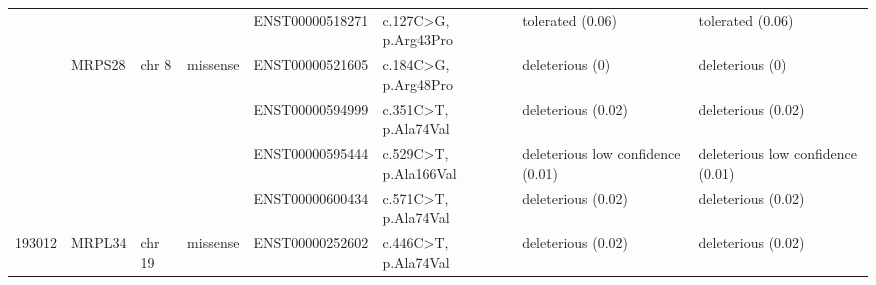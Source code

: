 \documentclass[fleqn,10pt]{wlscirep}
\begin{document}
\begin{landscape}
\begin{table}[]
{\begin{tabular}{|l|l|l|l|l|l|l|l|}
{\color[HTML]{000000} }                         & {\color[HTML]{000000} }                         & {\color[HTML]{000000} }                         & {\color[HTML]{000000} }                           & {\color[HTML]{000000} ENST00000518271}     & {\color[HTML]{000000} c.127C\textgreater{}G, p.Arg43Pro}   & {\color[HTML]{000000} tolerated (0.06)}                  & tolerated (0.06)                  \\ \cline{5-8} 
{\color[HTML]{000000} }                         & \multirow{-3}{*}{{\color[HTML]{000000} MRPS28}} & \multirow{-3}{*}{{\color[HTML]{000000} chr 8}}  & \multirow{-3}{*}{{\color[HTML]{000000} missense}} & {\color[HTML]{000000} ENST00000521605}     & {\color[HTML]{000000} c.184C\textgreater{}G, p.Arg48Pro}   & {\color[HTML]{000000} deleterious (0)}                   & deleterious (0)                   \\ \cline{2-8} 
{\color[HTML]{000000} }                         & {\color[HTML]{000000} }                         & {\color[HTML]{000000} }                         & {\color[HTML]{000000} }                           & {\color[HTML]{000000} ENST00000594999}     & {\color[HTML]{000000} c.351C\textgreater{}T, p.Ala74Val}   & {\color[HTML]{000000} deleterious (0.02)}                & deleterious (0.02)                \\ \cline{5-8} 
{\color[HTML]{000000} }                         & {\color[HTML]{000000} }                         & {\color[HTML]{000000} }                         & {\color[HTML]{000000} }                           & {\color[HTML]{000000} ENST00000595444}     & {\color[HTML]{000000} c.529C\textgreater{}T, p.Ala166Val}  & {\color[HTML]{000000} deleterious low confidence (0.01)} & deleterious low confidence (0.01) \\ \cline{5-8} 
{\color[HTML]{000000} }                         & {\color[HTML]{000000} }                         & {\color[HTML]{000000} }                         & {\color[HTML]{000000} }                           & {\color[HTML]{000000} ENST00000600434}     & {\color[HTML]{000000} c.571C\textgreater{}T, p.Ala74Val}   & {\color[HTML]{000000} deleterious (0.02)}                & deleterious (0.02)                \\ \cline{5-8} 
\multirow{-7}{*}{{\color[HTML]{000000} 193012}} & \multirow{-4}{*}{{\color[HTML]{000000} MRPL34}} & \multirow{-4}{*}{{\color[HTML]{000000} chr 19}} & \multirow{-4}{*}{{\color[HTML]{000000} missense}} & {\color[HTML]{000000} ENST00000252602}     & {\color[HTML]{000000} c.446C\textgreater{}T, p.Ala74Val}   & {\color[HTML]{000000} deleterious (0.02)}                & deleterious (0.02)                \\ \hline

\end{tabular}}
\end{table}
\end{landscape}
\end{document}
